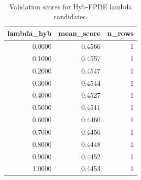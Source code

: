 \begin{table}[t]
\caption{Validation scores for Hyb-FPDE lambda candidates.}
\label{tab:lambda_distribution_computed}
\centering
\begin{tabular}{rrr}
\toprule
lambda\_hyb & mean\_score & n\_rows \\
\midrule
0.0000 & 0.4566 & 1 \\
0.1000 & 0.4557 & 1 \\
0.2000 & 0.4547 & 1 \\
0.3000 & 0.4544 & 1 \\
0.4000 & 0.4527 & 1 \\
0.5000 & 0.4511 & 1 \\
0.6000 & 0.4460 & 1 \\
0.7000 & 0.4456 & 1 \\
0.8000 & 0.4448 & 1 \\
0.9000 & 0.4452 & 1 \\
1.0000 & 0.4453 & 1 \\
\bottomrule
\end{tabular}

\end{table}
